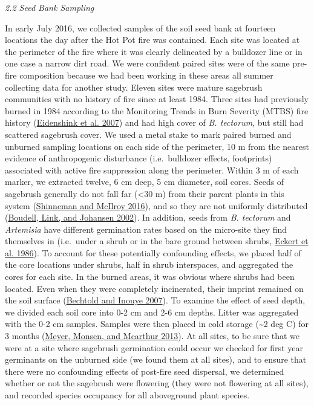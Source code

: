 \documentclass[
  12pt,
]{article}
\begin{document}
\emph{2.2 Seed Bank Sampling}

In early July 2016, we collected samples of the soil seed bank at
fourteen locations the day after the Hot Pot fire was contained. Each
site was located at the perimeter of the fire where it was clearly
delineated by a bulldozer line or in one case a narrow dirt road. We
were confident paired sites were of the same pre-fire composition
because we had been working in these areas all summer collecting data
for another study. Eleven sites were mature sagebrush communities with
no history of fire since at least 1984. Three sites had previously
burned in 1984 according to the Monitoring Trends in Burn Severity
(MTBS) fire history (\protect\hyperlink{ref-Eidenshink2007}{Eidenshink
et al. 2007}) and had high cover of \emph{B. tectorum}, but still had
scattered sagebrush cover. We used a metal stake to mark paired burned
and unburned sampling locations on each side of the perimeter, 10 m from
the nearest evidence of anthropogenic disturbance (i.e.~bulldozer
effects, footprints) associated with active fire suppression along the
perimeter. Within 3 m of each marker, we extracted twelve, 6 cm deep, 5
cm diameter, soil cores. Seeds of sagebrush generally do not fall far
(\textless30 m) from their parent plants in this system
(\protect\hyperlink{ref-Shinneman2016}{Shinneman and McIlroy 2016}), and
so they are not uniformly distributed
(\protect\hyperlink{ref-Boudell2002}{Boudell, Link, and Johansen 2002}).
In addition, seeds from \emph{B. tectorum} and \emph{Artemisia} have
different germination rates based on the micro-site they find themselves
in (i.e.~under a shrub or in the bare ground between shrubs,
\protect\hyperlink{ref-Eckert1986}{Eckert et al. 1986}). To account for
these potentially confounding effects, we placed half of the core
locations under shrubs, half in shrub interspaces, and aggregated the
cores for each site. In the burned areas, it was obvious where shrubs
had been located. Even when they were completely incinerated, their
imprint remained on the soil surface
(\protect\hyperlink{ref-Bechtold2007}{Bechtold and Inouye 2007}). To
examine the effect of seed depth, we divided each soil core into 0-2 cm
and 2-6 cm depths. Litter was aggregated with the 0-2 cm samples.
Samples were then placed in cold storage (\textasciitilde2 deg C) for 3
months (\protect\hyperlink{ref-Meyer2013}{Meyer, Monsen, and Mcarthur
2013}). At all sites, to be sure that we were at a site where sagebrush
germination could occur we checked for first year germinants on the
unburned side (we found them at all sites), and to ensure that there
were no confounding effects of post-fire seed dispersal, we determined
whether or not the sagebrush were flowering (they were not flowering at
all sites), and recorded species occupancy for all aboveground plant
species.
\end{document}
